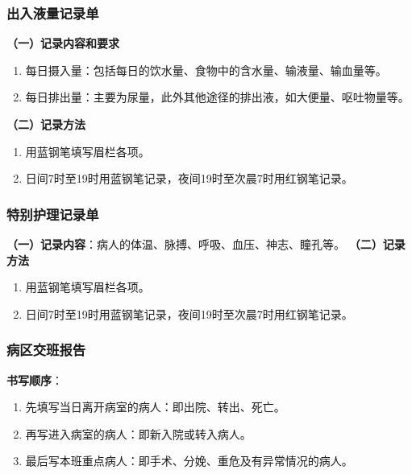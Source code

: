 \documentclass[11pt, a4paper]{ctexart}
\begin{document}
\subsubsection{出入液量记录单}
\textbf{（一）记录内容和要求}
\begin{enumerate}
	\item 每日摄入量：包括每日的饮水量、食物中的含水量、输液量、输血量等。
	\item 每日排出量：主要为尿量，此外其他途径的排出液，如大便量、呕吐物量等。
\end{enumerate}
\textbf{（二）记录方法}
\begin{enumerate}
	\item 用蓝钢笔填写眉栏各项。
	\item 日间7时至19时用蓝钢笔记录，夜间19时至次晨7时用红钢笔记录。
\end{enumerate}

\subsubsection{特别护理记录单}
\textbf{（一）记录内容}：病人的体温、脉搏、呼吸、血压、神志、瞳孔等。
\textbf{（二）记录方法}
\begin{enumerate}
	\item 用蓝钢笔填写眉栏各项。
	\item 日间7时至19时用蓝钢笔记录，夜间19时至次晨7时用红钢笔记录。
\end{enumerate}

\subsubsection{病区交班报告}
\textbf{书写顺序}：
\begin{enumerate}
	\item 先填写当日离开病室的病人：即出院、转出、死亡。
	\item 再写进入病室的病人：即新入院或转入病人。
	\item 最后写本班重点病人：即手术、分娩、重危及有异常情况的病人。
\end{enumerate}
\end{document}
